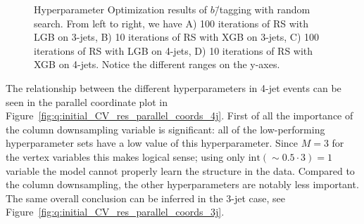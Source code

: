 \begin{figure}%
  \centering
  \;
  \vspace{2mm}
  \caption[Hyperparameter Optimization of $b$\=/tagging]{
    Hyperparameter Optimization results of $b$\=/tagging with random search. From left to right, we have A) \num{100} iterations of RS with LGB on 3-jets, B) \num{10} iterations of RS with XGB on 3-jets, C) \num{100} iterations of RS with LGB on 4-jets, D) \num{10} iterations of RS with XGB on 4-jets. Notice the different ranges on the y-axes.}
  \label{fig:q:CV_res_iterations_b_tagging}%
\end{figure}
\vspace{0.5cm}

The relationship between the different hyperparameters in 4-jet events can be seen in the parallel coordinate plot in Figure~\ref{fig:q:initial_CV_res_parallel_coords_4j}. First of all the importance of the column downsampling  variable is significant: all of the low-performing hyperparameter sets have a low value of this hyperparameter. Since $M=3$ for the vertex variables this makes logical sense; using only $\mathrm{int}(\sim 0.5 \cdot 3) = 1$ variable the model cannot properly learn the structure in the data. Compared to the column downsampling, the other hyperparameters are notably less important. The same overall conclusion can be inferred in the 3-jet case, see Figure~\ref{fig:q:initial_CV_res_parallel_coords_3j}.

